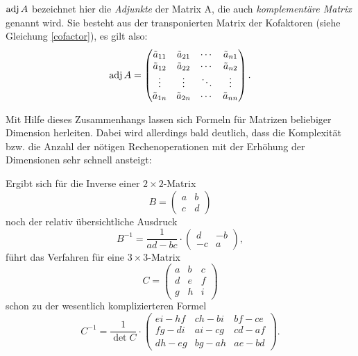 $\operatorname{adj}A$ bezeichnet hier die \emph{Adjunkte} der Matrix A, die auch \emph{komplementäre Matrix} genannt wird. Sie besteht aus der transponierten Matrix der Kofaktoren (siehe Gleichung \ref{cofactor}), es gilt also:
\begin{equation}
 \operatorname{adj}A = \begin{pmatrix}
   \tilde a_{11} & \tilde a_{21} & \cdots & \tilde a_{n1}\\
   \tilde a_{12} & \tilde a_{22} & \cdots & \tilde a_{n2}\\
   \vdots & \vdots & \ddots & \vdots\\
   \tilde a_{1n} & \tilde a_{2n} & \cdots & \tilde a_{nn}
 \end{pmatrix}.
\end{equation}

Mit Hilfe dieses Zusammenhangs lassen sich Formeln für Matrizen beliebiger Dimension herleiten. Dabei wird allerdings bald deutlich, dass die Komplexität bzw. die Anzahl der nötigen Rechenoperationen mit der Erhöhung der Dimensionen sehr schnell ansteigt:

Ergibt sich für die Inverse einer $2 \times 2$-Matrix
\begin{equation}
 B = \begin{pmatrix}
  a & b \\
  c & d
 \end{pmatrix}
\end{equation}
noch der relativ übersichtliche Ausdruck
\begin{equation}
 B^{-1} = \frac{1}{ad-bc} \cdot
 \begin{pmatrix}
  d & -b \\
  -c & a
 \end{pmatrix},
\end{equation}
führt das Verfahren für eine $3 \times 3$-Matrix
\begin{equation}
 C = \begin{pmatrix}
  a & b & c \\
  d & e & f \\
  g & h & i
 \end{pmatrix}
\end{equation}
schon zu der wesentlich komplizierteren Formel
\begin{equation}
 C^{-1} = \frac{1}{\det C} \cdot
 \begin{pmatrix}
  ei - hf & ch - bi & bf - ce \\
  fg - di & ai - cg & cd - af \\
  dh - eg & bg - ah & ae - bd
 \end{pmatrix}.
\end{equation}

